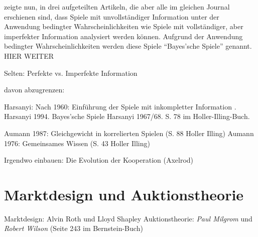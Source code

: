 \textcite{Harsanyi1967} zeigte nun, in drei aufgeteilten Artikeln, die aber alle im gleichen Journal erschienen sind, dass Spiele mit unvollständiger Information unter der Anwendung bedingter Wahrscheinlichkeiten wie Spiele mit vollständiger, aber imperfekter Information analysiert werden können. Aufgrund der Anwendung bedingter Wahrscheinlichkeiten werden diese Spiele "`Bayes'sche Spiele"' genannt.  HIER WEITER





Selten:  Perfekte vs. Imperfekte Information



davon abzugrenzen:

Harsanyi: Nach 1960: Einführung der Spiele mit inkompletter Information . Harsanyi 1994.
Bayes'sche Spiele Harsanyi 1967/68. S. 78 im Holler-Illing-Buch.


Aumann 1987: Gleichgewicht in korrelierten Spielen (S. 88 Holler Illing) Aumann 1976: Gemeinsames Wissen (S. 43 Holler Illing)


Irgendwo einbauen: Die Evolution der Kooperation (Axelrod)
\section{Marktdesign und Auktionstheorie}

Marktdesign: Alvin Roth und Lloyd Shapley 
Auktionstheorie: \textit{Paul Milgrom} und \textit{Robert Wilson} (Seite 243 im Bernstein-Buch)



